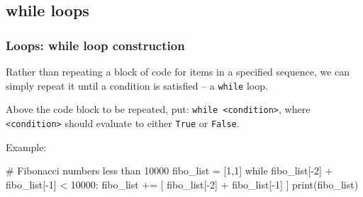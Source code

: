 \documentclass{beamer}
\newenvironment{codeblock}
    {\hfill\begin{beamerboxesrounded}[lower=codecol, width=0.8\textwidth]
    \medskip

    }
    { 
    \end{beamerboxesrounded}\hfill
    }
\theoremstyle{example}
\newcommand{\ttt}[1]{{\small\texttt{#1}}}
\begin{document}
\subsection{while loops}
\begin{frame}[fragile]
\frametitle{Loops: {\ttm while} loop construction}

Rather than repeating a block of code for items in a specified sequence, we can simply repeat it until a condition is satisfied {--} a \ttt{while} loop.

\pause
\vspace*{12pt}
Above the code block to be repeated, put: \ttt{while <condition>}, where \ttt{<condition>} should evaluate to either \ttt{True} or \ttt{False}.

Example:
\vspace*{12pt}

\begin{codeblock}

\begin{python}
# Fibonacci numbers less than 10000
fibo_list = [1,1]
while fibo_list[-2] + fibo_list[-1] < 10000:
    fibo_list += [ fibo_list[-2] + fibo_list[-1] ]
print(fibo_list)
\end{python}

\end{codeblock}

\end{frame}
\end{document}
